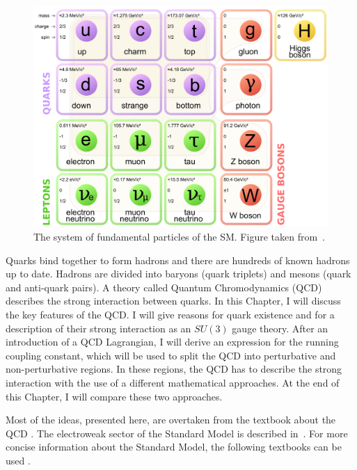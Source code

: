 \begin{figure}[t]
  \centering
  \includegraphics[width=\textwidth]{Chapter1/SM.png} 
  \caption[The system of fundamental particles of the SM.]
          {The system of fundamental particles of the SM. Figure taken
           from~\cite{wiki:SMParticlesSource}.} 
  \label{fig:SMparticles}
\end{figure}

Quarks bind together to form hadrons and there are hundreds
\cite{PDG2014} of known hadrons up to date. Hadrons are
divided into baryons (quark triplets) and mesons (quark and anti-quark pairs). 
A theory called Quantum Chromodynamics (QCD) describes the strong interaction
between quarks.  
In this Chapter, I will discuss the key features of the QCD. 
I will give reasons for quark existence and for a description of their strong
interaction as an $SU(3)$ gauge theory. 
After an introduction of a QCD Lagrangian, I will derive an expression for the
running coupling constant, which will be used to split the QCD into perturbative
and non-perturbative regions. 
In these regions, the QCD has to describe the strong interaction with the use of
a different mathematical approaches. 
At the end of this Chapter, I will compare
these two approaches.

Most of the ideas, presented here, are overtaken from the textbook 
about the QCD \cite{QCDTextbook}. 
The electroweak sector of the Standard Model is described
in~\cite{horejsi2002fundamentals}. 
For more concise information about the Standard Model, the following textbooks
can be used \cite{griffiths2008introduction,cottingham2007introduction}.

